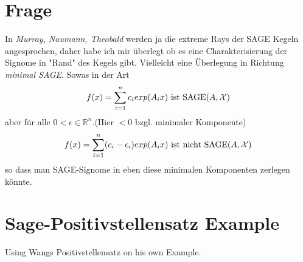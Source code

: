 \documentclass[./main.tex]{subfiles}
\begin{document}
\section{Frage}
In \emph{Murray, Naumann, Theobald} werden ja die extreme Rays der SAGE Kegeln angesprochen, daher habe ich mir überlegt ob es eine Charakterisierung der Signome in  "Rand" des Kegels gibt. Vielleicht eine Überlegung in Richtung \emph{minimal SAGE}. Sowas in der Art
\begin{align*}
f(x) = \sum_{i=1}^n c_i exp(A_ix) \text{ ist SAGE}(A,\mathcal{X})
\end{align*}
aber für alle $0<\epsilon \in \mathbb{R}^n$.(Hier $<0$ bzgl. minimaler Komponente)
\begin{align*}
f(x) = \sum_{i=1}^n (c_i- \epsilon_i) exp(A_ix) \text{ ist nicht SAGE}(A,\mathcal{X})
\end{align*}
so dass man SAGE-Signome in eben diese minimalen Komponenten zerlegen könnte. 

\section{Sage-Positivstellensatz Example}
Using Wangs Positivstellensatz on his own Example.
\end{document}
